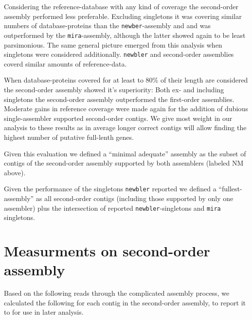 
Considering the reference-database with any kind of coverage the
second-order assembly performed less preferable. Excluding singletons
it was covering similar numbers of database-proteins than the
\texttt{newber}-assembly and and was outperformed by the
\texttt{mira}-assembly, although the latter showed again to be least
parsimonious. The same general picture emerged from this analysis when
singletons were considered additionally. \texttt{newbler} and
second-order assemblies coverd similar amounts of reference-data.


When database-proteins covered for at least to 80\% of their length
are considered the second-order assembly showed it's superiority: Both
ex- and including singletons the second-order assembly outperformed
the first-order assemblies. Moderate gains in reference coverage were
made again for the addition of dubious single-assembler supported
second-order contigs. We give most weight in our analysis to these
results as in average longer correct contigs will allow finding the
highest number of putative full-lenth genes.

Given this evaluation we defined a ``minimal adequate'' assembly as
the subset of contigs of the second-order assembly supported by both
assemblers (labeled NM above).

Given the performance of the singletons \texttt{newbler} reported we
defined a ``fullest-assembly'' as all second-order contigs (including
those supported by only one assembler) plus the intersection of
reported \texttt{newbler}-singletons and \texttt{mira} singletons.

\section{Measurments on second-order assembly}

Based on the following reads through the complicated assembly process,
we calculated the following for each contig in the second-order
assembly, to report it to for use in later analysis.

